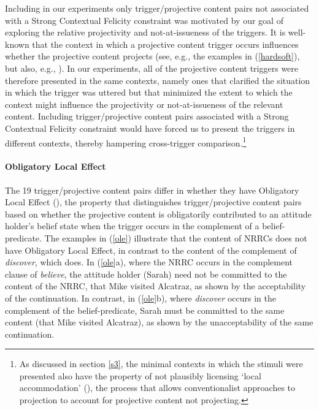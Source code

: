 \documentclass[11pt,fleqn]{article}
\newcommand{\6}{\mbox{$[\hspace*{-.6mm}[$}}
\newcommand{\9}{\mbox{$]\hspace*{-.6mm}]$}}
\begin{document}
Including in our experiments only trigger/projective content pairs not associated with a Strong Contextual Felicity constraint was motivated by our goal of exploring the relative projectivity and not-at-issueness of the triggers. It is well-known that the context in which a projective content trigger occurs influences whether the projective content projects (see, e.g., the examples in (\ref{hardsoft}), but also, e.g., \citealt{simons01,beaver-belly}). In our experiments, all of the projective content triggers were therefore presented in the same contexts, namely ones that clarified the situation in which the trigger was uttered but that minimized the extent to which the context might influence the projectivity or not-at-issueness of the relevant content. Including trigger/projective content pairs associated with a Strong Contextual Felicity constraint would have forced us to present the triggers in different contexts, thereby hampering cross-trigger comparison.\footnote{As discussed in section \ref{s3}, the minimal contexts in which the stimuli were presented also have the property of not plausibly licensing `local accommodation' (\citealt{heim83,vds92}), the process that allows conventionalist approaches to projection to account for projective content not projecting.} 

\paragraph{Obligatory Local Effect} The 19 trigger/projective content pairs differ in whether they have Obligatory Local Effect (\citealt{brst-lang11}), the property that distinguishes trigger/projective content pairs based on whether the projective content is obligatorily contributed to an attitude holder's belief state when the trigger occurs in the complement of a belief-predicate. The examples in (\ref{ole}) illustrate that the content of NRRCs does not have Obligatory Local Effect, in contrast to the content of the complement of {\em discover}, which does. In (\ref{ole}a), where the NRRC occurs in the complement clause of {\em believe}, the attitude holder (Sarah) need not be committed to the content of the NRRC, that Mike visited Alcatraz, as shown by the acceptability of the continuation. In contrast, in (\ref{ole}b), where {\em discover} occurs in the complement of the belief-predicate, Sarah must be committed to the same content (that Mike visited Alcatraz), as shown by the unacceptability of the same continuation. 
\end{document}
